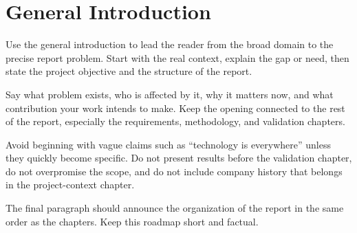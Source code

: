 \chapter*{General Introduction}
{}
\label{chap:general-introduction}

Use the general introduction to lead the reader from the broad domain to the precise report problem. Start with the real context, explain the gap or need, then state the project objective and the structure of the report.

Say what problem exists, who is affected by it, why it matters now, and what contribution your work intends to make. Keep the opening connected to the rest of the report, especially the requirements, methodology, and validation chapters.

Avoid beginning with vague claims such as ``technology is everywhere'' unless they quickly become specific. Do not present results before the validation chapter, do not overpromise the scope, and do not include company history that belongs in the project-context chapter.

The final paragraph should announce the organization of the report in the same order as the chapters. Keep this roadmap short and factual.